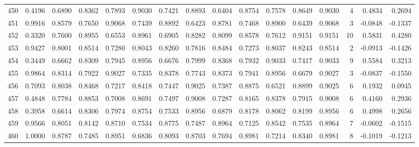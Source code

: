 \begin{tabular}{lrrrrrrrrrrrrrrr}
450 &      0.4196 &  0.6890 &  0.8362 &  0.7893 &  0.9030 &  0.7421 &  0.8893 &  0.6404 &  0.8754 &  0.7578 &   0.8649 &     0.9030 &      4 &                    0.4834 &                     0.2694 \\
451 &      0.9916 &  0.8579 &  0.7650 &  0.9068 &  0.7439 &  0.8892 &  0.6423 &  0.8781 &  0.7468 &  0.8900 &   0.6439 &     0.9068 &      3 &                   -0.0848 &                    -0.1337 \\
452 &      0.3320 &  0.7600 &  0.8955 &  0.6553 &  0.8961 &  0.6905 &  0.8282 &  0.8099 &  0.8578 &  0.7612 &   0.9151 &     0.9151 &     10 &                    0.5831 &                     0.4280 \\
453 &      0.9427 &  0.8001 &  0.8514 &  0.7280 &  0.8043 &  0.8260 &  0.7816 &  0.8484 &  0.7273 &  0.8037 &   0.8243 &     0.8514 &      2 &                   -0.0913 &                    -0.1426 \\
454 &      0.3449 &  0.6662 &  0.8309 &  0.7945 &  0.8956 &  0.6676 &  0.7999 &  0.8368 &  0.7932 &  0.9033 &   0.7417 &     0.9033 &      9 &                    0.5584 &                     0.3213 \\
455 &      0.9864 &  0.8314 &  0.7922 &  0.9027 &  0.7335 &  0.8378 &  0.7743 &  0.8373 &  0.7941 &  0.8956 &   0.6679 &     0.9027 &      3 &                   -0.0837 &                    -0.1550 \\
456 &      0.7093 &  0.8038 &  0.8468 &  0.7217 &  0.8418 &  0.7447 &  0.9025 &  0.7387 &  0.8875 &  0.6521 &   0.8899 &     0.9025 &      6 &                    0.1932 &                     0.0945 \\
457 &      0.4848 &  0.7784 &  0.8853 &  0.7008 &  0.8691 &  0.7497 &  0.9008 &  0.7287 &  0.8165 &  0.8378 &   0.7915 &     0.9008 &      6 &                    0.4160 &                     0.2936 \\
458 &      0.3958 &  0.6614 &  0.8306 &  0.7974 &  0.8754 &  0.7533 &  0.8956 &  0.6879 &  0.8178 &  0.8062 &   0.8199 &     0.8956 &      6 &                    0.4998 &                     0.2656 \\
459 &      0.9566 &  0.8051 &  0.8142 &  0.8710 &  0.7534 &  0.8775 &  0.7487 &  0.8964 &  0.7125 &  0.8542 &   0.7535 &     0.8964 &      7 &                   -0.0602 &                    -0.1515 \\
460 &      1.0000 &  0.8787 &  0.7485 &  0.8951 &  0.6836 &  0.8093 &  0.8703 &  0.7694 &  0.8981 &  0.7214 &   0.8340 &     0.8981 &      8 &                   -0.1019 &                    -0.1213 \\

\end{tabular}
